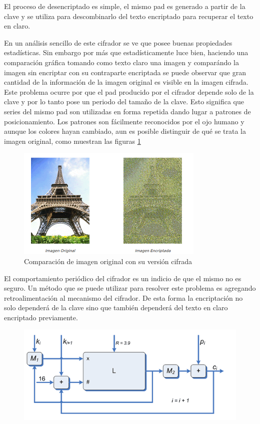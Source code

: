 \begin{example}
El proceso de desencriptado es simple, el mismo pad es generado a partir de la clave y se utiliza para descombinarlo del texto encriptado para recuperar el texto en claro.

En un análisis sencillo de este cifrador se ve que posee buenas propiedades estadísticas. Sin embargo por más que estadísticamente luce bien, haciendo una comparación gráfica tomando como texto claro una imagen y comparándo la imagen sin encriptar con su contraparte encriptada se puede observar que gran cantidad de la información de la imagen original es visible en la imagen cifrada. Este problema ocurre por que el pad producido por el cifrador depende solo de la clave y por lo tanto pose un periodo del tamaño de la clave. Esto significa que series del mismo pad son utilizadas en forma repetida dando lugar a patrones de posicionamiento. Los patrones son fácilmente reconocidos por el ojo humano y aunque los colores hayan cambiado, aun es posible distinguir de qué se trata la imagen original, como muestran las figuras \ref{fig:ImagenCifrada}

\begin{figure}[hbpt]
\centering
\includegraphics[width = 0.8\textwidth]{img/imagenCifrada.png}
\caption{Comparación de imagen original con su versión cifrada}
\label{fig:ImagenCifrada}
\end{figure}

El comportamiento periódico del cifrador es un indicio de que el mismo no es seguro. Un método que se puede utilizar para resolver este problema es agregando retroalimentación al mecanismo del cifrador. De esta forma la encriptación no solo dependerá de la clave sino que también dependerá del texto en claro encriptado previamente.

\begin{figure}[H]
\centering
\includegraphics[width = \textwidth]{img/cifradoCaoticoRetro.png}
\end{figure}


\end{example}
